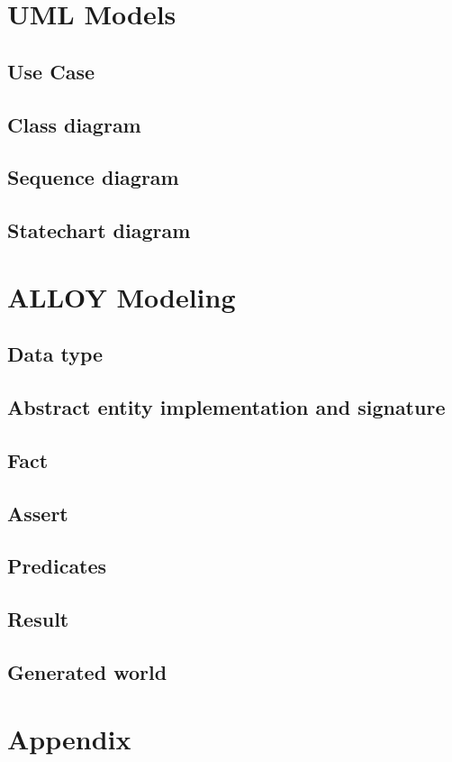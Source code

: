 \documentclass[18pt,oneside,a4paper, titlepage]{article}
\begin{document}
\newpage
\section{UML Models}
	\subsection{Use Case}
	\subsection{Class diagram}
	\subsection{Sequence diagram}
	\subsection{Statechart diagram}

\newpage
\section{ALLOY Modeling}
	\subsection{Data type}
	\subsection{Abstract entity implementation and signature}
	\subsection{Fact}
	\subsection{Assert}
	\subsection{Predicates}
	\subsection{Result}
	\subsection{Generated world}

\newpage
\section{Appendix}
\end{document}
